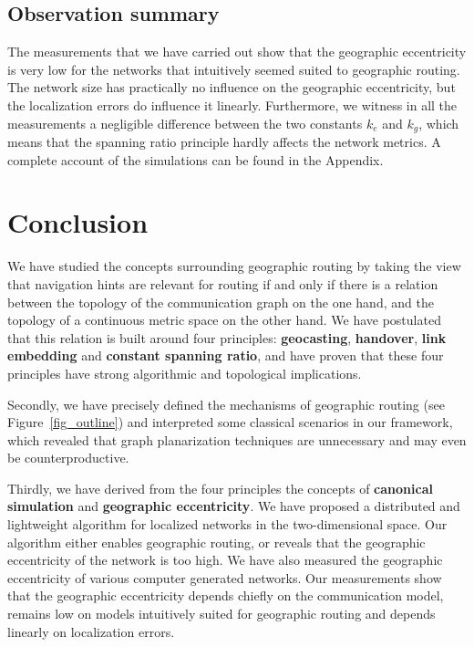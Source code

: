 \documentclass{article}
\begin{document}
\subsection{Observation summary}

The measurements that we have carried out show that the geographic eccentricity is very low for the networks that intuitively seemed suited to geographic routing. The network size has practically no influence on the geographic eccentricity, but the localization errors do influence it linearly.
 Furthermore, we witness in all the measurements
a negligible difference between the two constants $k_e$ and $k_g$, which means that the spanning ratio principle hardly affects the network metrics. 
A complete account of the simulations can be found in the Appendix.

\section{Conclusion}

We have studied the concepts surrounding geographic routing by taking the view that navigation hints are relevant for routing if and only if there is a relation between the topology of the communication graph on the one hand, and the topology of a continuous metric space on the other hand. We have postulated that this relation is built around four principles: {\bf geocasting}, {\bf handover}, {\bf link embedding} and {\bf constant spanning ratio}, and have proven that these four principles have strong algorithmic and topological implications.

Secondly, we have precisely defined the mechanisms of geographic routing (see Figure~\ref{fig_outline}) and interpreted some classical scenarios in our framework, which revealed that graph planarization techniques are unnecessary and may even be counterproductive.

Thirdly, we have derived from the four principles the concepts of {\bf canonical simulation} and {\bf geographic eccentricity}. We have proposed a distributed and lightweight algorithm for localized networks in the two-dimensional space. Our algorithm either enables geographic routing, or reveals that the geographic eccentricity of the network is too high. We have also measured the geographic eccentricity of various computer generated networks. Our measurements show that the geographic eccentricity depends chiefly on the communication model, remains low on models intuitively suited for geographic routing and depends linearly on localization errors.
\end{document}
